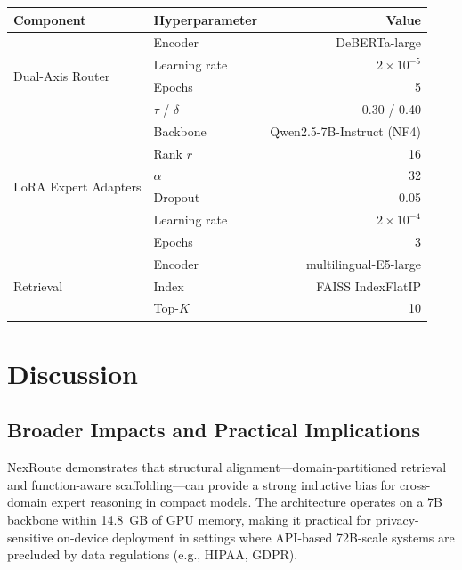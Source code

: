 \documentclass[a4paper,fleql]{cas-sc}
\begin{document}
\vspace{6pt}
\begin{center}
\begingroup
{}
\label{tab:hyperparams_all}
\small
\begin{tabular}{llr}
\toprule
\textbf{Component} & \textbf{Hyperparameter} & \textbf{Value} \\
\midrule
\multirow{4}{*}{Dual-Axis Router}
  & Encoder           & DeBERTa-large \\
  & Learning rate     & $2 \times 10^{-5}$ \\
  & Epochs            & 5 \\
  & $\tau$ / $\delta$ & 0.30 / 0.40 \\
\midrule
\multirow{6}{*}{LoRA Expert Adapters}
  & Backbone        & Qwen2.5-7B-Instruct (NF4) \\
  & Rank $r$        & 16 \\
  & $\alpha$        & 32 \\
  & Dropout         & 0.05 \\
  & Learning rate   & $2 \times 10^{-4}$ \\
  & Epochs          & 3 \\
\midrule
\multirow{3}{*}{Retrieval}
  & Encoder  & multilingual-E5-large \\
  & Index    & FAISS IndexFlatIP \\
  & Top-$K$  & 10 \\
\bottomrule
\end{tabular}
\endgroup
\end{center}
\vspace{6pt}

\section{Discussion}
\label{sec:discussion}

\subsection{Broader Impacts and Practical Implications}
NexRoute demonstrates that structural alignment---domain-partitioned retrieval
and function-aware scaffolding---can provide a strong inductive bias for
cross-domain expert reasoning in compact models. The architecture operates on
a 7B backbone within 14.8~GB of GPU memory, making it practical for
privacy-sensitive on-device deployment in settings where API-based 72B-scale
systems are precluded by data regulations (e.g., HIPAA, GDPR).
\end{document}
